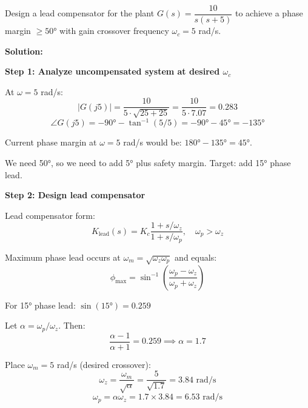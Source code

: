 \begin{example}
\label{ex:design_margins}
Design a lead compensator for the plant $G(s) = \dfrac{10}{s(s+5)}$ to achieve a phase margin $\geq 50°$ with gain crossover frequency $\omega_c = 5$ rad/s.

\textbf{Solution:}

\textbf{Step 1: Analyze uncompensated system at desired $\omega_c$}

At $\omega = 5$ rad/s:
\begin{equation*}
|G(j5)| = \frac{10}{5 \cdot \sqrt{25+25}} = \frac{10}{5 \cdot 7.07} = 0.283
\end{equation*}
\begin{equation*}
\angle G(j5) = -90° - \tan^{-1}(5/5) = -90° - 45° = -135°
\end{equation*}

Current phase margin at $\omega = 5$ rad/s would be: $180° - 135° = 45°$.

We need 50°, so we need to add 5° plus safety margin. Target: add 15° phase lead.

\textbf{Step 2: Design lead compensator}

Lead compensator form:
\begin{equation*}
K_{\text{lead}}(s) = K_c \frac{1 + s/\omega_z}{1 + s/\omega_p}, \quad \omega_p > \omega_z
\end{equation*}

Maximum phase lead occurs at $\omega_m = \sqrt{\omega_z \omega_p}$ and equals:
\begin{equation*}
\phi_{\max} = \sin^{-1}\left(\frac{\omega_p - \omega_z}{\omega_p + \omega_z}\right)
\end{equation*}

For 15° phase lead: $\sin(15°) = 0.259$

Let $\alpha = \omega_p/\omega_z$. Then:
\begin{equation*}
\frac{\alpha - 1}{\alpha + 1} = 0.259 \implies \alpha = 1.7
\end{equation*}

Place $\omega_m = 5$ rad/s (desired crossover):
\begin{equation*}
\omega_z = \frac{\omega_m}{\sqrt{\alpha}} = \frac{5}{\sqrt{1.7}} = 3.84 \text{ rad/s}
\end{equation*}
\begin{equation*}
\omega_p = \alpha \omega_z = 1.7 \times 3.84 = 6.53 \text{ rad/s}
\end{equation*}


\end{example}
